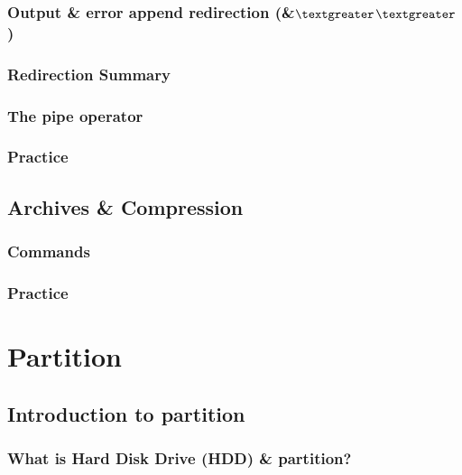 \documentclass[14pt,fleqn]{extbook} %
\begin{document}
\subsection{Output \& error append redirection (\&\textbf{{$\textgreater$}}\textbf{{$\textgreater$}} )}

\subsection{Redirection Summary}

\subsection{The pipe operator}

\subsection{Practice}

\section{Archives \& Compression}

\subsection{Commands}

\subsection{Practice}

\chapter{Partition}
\section{Introduction to partition}

\subsection{What is \textbf{H}ard \textbf{D}isk \textbf{D}rive (HDD) \& partition?}

\end{document}
